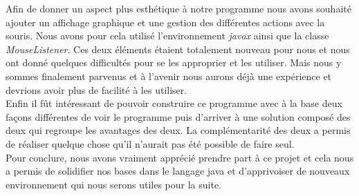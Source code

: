 \documentclass[12,french]{report}
\begin{document}
Afin de donner un aspect plus esthétique à notre programme nous avons souhaité ajouter un affichage graphique et une gestion des différentes actions avec la souris. Nous avons pour cela utilisé l'environnement \textit{javax} ainsi que la classe \textit{MouseListener}. Ces deux éléments étaient totalement nouveau pour nous et nous ont donné quelques difficultés pour se les approprier et les utiliser. Mais nous y sommes finalement parvenus et à l'avenir nous aurons déjà une expérience et devrions avoir plus de facilité à les utiliser. \\

Enfin il fût intéressant de pouvoir construire ce programme avec à la base deux façons différentes de voir le programme puis d'arriver à une solution composé des deux qui regroupe les avantages des deux. La complémentarité des deux a permis de réaliser quelque chose qu'il n'aurait pas été possible de faire seul.\\

Pour conclure, nous avons vraiment apprécié prendre part à ce projet et cela nous a permis de solidifier nos bases dans le langage java et d'apprivoiser de nouveaux environnement qui nous serons utiles pour la suite.
\end{document}

